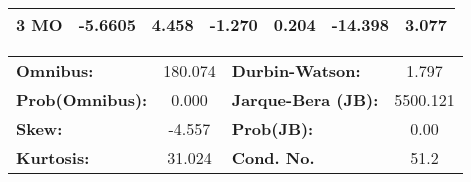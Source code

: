 \begin{center}
\begin{tabular}{lcccccc}
\textbf{3 MO}    &      -5.6605  &        4.458     &    -1.270  &         0.204        &      -14.398    &        3.077     \\
\bottomrule
\end{tabular}
\begin{tabular}{lclc}
\textbf{Omnibus:}       & 180.074 & \textbf{  Durbin-Watson:     } &    1.797  \\
\textbf{Prob(Omnibus):} &   0.000 & \textbf{  Jarque-Bera (JB):  } & 5500.121  \\
\textbf{Skew:}          &  -4.557 & \textbf{  Prob(JB):          } &     0.00  \\
\textbf{Kurtosis:}      &  31.024 & \textbf{  Cond. No.          } &     51.2  \\
\bottomrule
\end{tabular}
\end{center}

